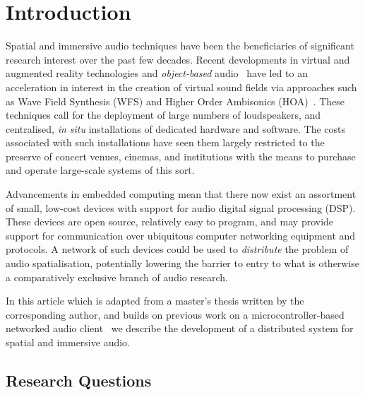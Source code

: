 \section{Introduction}\label{sec:introduction}




Spatial and immersive audio techniques have been the beneficiaries of
significant research interest over the past few decades.
Recent developments in virtual and augmented reality technologies and
\textit{object-based} audio~\citep{geier_object-based_2010} have led to an
acceleration in interest in the creation of virtual sound fields via approaches
such as Wave Field Synthesis (WFS) and Higher Order Ambisonics
(HOA)~\citep{berkhout_acoustic_1993,ahrens_theory_2008,daniel_further_2003,
    frank_producing_2015}.
These techniques call for the deployment of large numbers of loudspeakers, and
centralised, \textit{in situ} installations of dedicated hardware and software.
The costs associated with such installations have seen them largely restricted
to the preserve of concert venues, cinemas, and institutions with the means to
purchase and operate large-scale systems of this sort.

Advancements in embedded computing mean that there now exist an assortment of
small, low-cost devices with support for audio digital signal processing (DSP).
These devices are open source, relatively easy to program, and may provide
support for communication over ubiquitous computer networking equipment and
protocols.
A network of such devices could be used to \textit{distribute} the problem of
audio spatialisation, potentially lowering the barrier to entry to what is
otherwise a comparatively exclusive branch of audio research.

In this article \textemdash{} which is adapted from a master's thesis written by
the corresponding author, and builds on previous work on a microcontroller-based
networked audio client~\citep{rushton_microcontroller-based_2023} \textemdash{}
we describe the development of a distributed system for spatial and immersive
audio.






\subsection{Research Questions}\label{subsec:research-questions}

